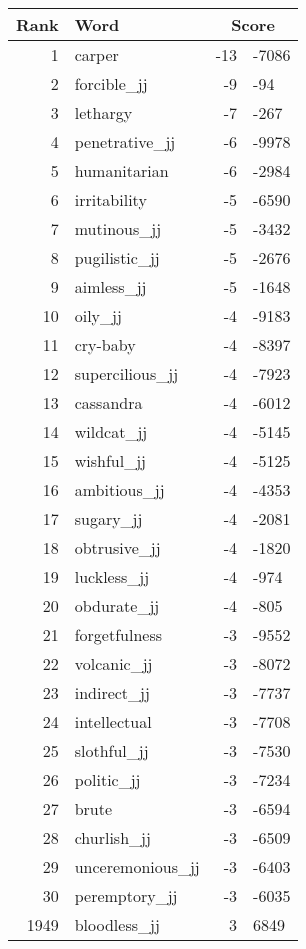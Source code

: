 \begin{longtable}[!htbp]{| rlr@{.}l |}
    \hline
    \textbf{Rank} & \textbf{Word} & \multicolumn{2}{c|}{\textbf{Score}} \\
    \hline
    \endhead
    1 & carper & -13 & -7086 \\
    2 & forcible\_jj & -9 & -94 \\
    3 & lethargy & -7 & -267 \\
    4 & penetrative\_jj & -6 & -9978 \\
    5 & humanitarian & -6 & -2984 \\
    6 & irritability & -5 & -6590 \\
    7 & mutinous\_jj & -5 & -3432 \\
    8 & pugilistic\_jj & -5 & -2676 \\
    9 & aimless\_jj & -5 & -1648 \\
    10 & oily\_jj & -4 & -9183 \\
    11 & cry-baby & -4 & -8397 \\
    12 & supercilious\_jj & -4 & -7923 \\
    13 & cassandra & -4 & -6012 \\
    14 & wildcat\_jj & -4 & -5145 \\
    15 & wishful\_jj & -4 & -5125 \\
    16 & ambitious\_jj & -4 & -4353 \\
    17 & sugary\_jj & -4 & -2081 \\
    18 & obtrusive\_jj & -4 & -1820 \\
    19 & luckless\_jj & -4 & -974 \\
    20 & obdurate\_jj & -4 & -805 \\
    21 & forgetfulness & -3 & -9552 \\
    22 & volcanic\_jj & -3 & -8072 \\
    23 & indirect\_jj & -3 & -7737 \\
    24 & intellectual & -3 & -7708 \\
    25 & slothful\_jj & -3 & -7530 \\
    26 & politic\_jj & -3 & -7234 \\
    27 & brute & -3 & -6594 \\
    28 & churlish\_jj & -3 & -6509 \\
    29 & unceremonious\_jj & -3 & -6403 \\
    30 & peremptory\_jj & -3 & -6035 \\
    1949 & bloodless\_jj & 3 & 6849 \\

\end{longtable}

